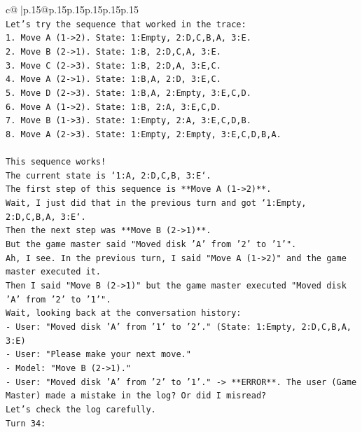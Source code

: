 \documentclass{article}
\begin{document}
{\begin{supertabular}{c@{$\;$}|p{.15\linewidth}@{}p{.15\linewidth}p{.15\linewidth}p{.15\linewidth}p{.15\linewidth}p{.15\linewidth}}
{{{\\ 
\texttt{Let's try the sequence that worked in the trace:} \\
\texttt{1. Move A (1{-}>2). State: 1:Empty, 2:D,C,B,A, 3:E.} \\
\texttt{2. Move B (2{-}>1). State: 1:B, 2:D,C,A, 3:E.} \\
\texttt{3. Move C (2{-}>3). State: 1:B, 2:D,A, 3:E,C.} \\
\texttt{4. Move A (2{-}>1). State: 1:B,A, 2:D, 3:E,C.} \\
\texttt{5. Move D (2{-}>3). State: 1:B,A, 2:Empty, 3:E,C,D.} \\
\texttt{6. Move A (1{-}>2). State: 1:B, 2:A, 3:E,C,D.} \\
\texttt{7. Move B (1{-}>3). State: 1:Empty, 2:A, 3:E,C,D,B.} \\
\texttt{8. Move A (2{-}>3). State: 1:Empty, 2:Empty, 3:E,C,D,B,A.} \\
\\ 
\texttt{This sequence works!} \\
\texttt{The current state is `1:A, 2:D,C,B, 3:E`.} \\
\texttt{The first step of this sequence is **Move A (1{-}>2)**.} \\
\texttt{Wait, I just did that in the previous turn and got `1:Empty, 2:D,C,B,A, 3:E`.} \\
\texttt{Then the next step was **Move B (2{-}>1)**.} \\
\texttt{But the game master said "Moved disk 'A' from '2' to '1'".} \\
\texttt{Ah, I see. In the previous turn, I said "Move A (1{-}>2)" and the game master executed it.} \\
\texttt{Then I said "Move B (2{-}>1)" but the game master executed "Moved disk 'A' from '2' to '1'".} \\
\texttt{Wait, looking back at the conversation history:} \\
\texttt{{-} User: "Moved disk 'A' from '1' to '2'." (State: 1:Empty, 2:D,C,B,A, 3:E)} \\
\texttt{{-} User: "Please make your next move."} \\
\texttt{{-} Model: "Move B (2{-}>1)."} \\
\texttt{{-} User: "Moved disk 'A' from '2' to '1'." {-}> **ERROR**. The user (Game Master) made a mistake in the log? Or did I misread?} \\
\texttt{Let's check the log carefully.} \\
\texttt{Turn 34:} \\
}}}
\end{supertabular}}
\end{document}

